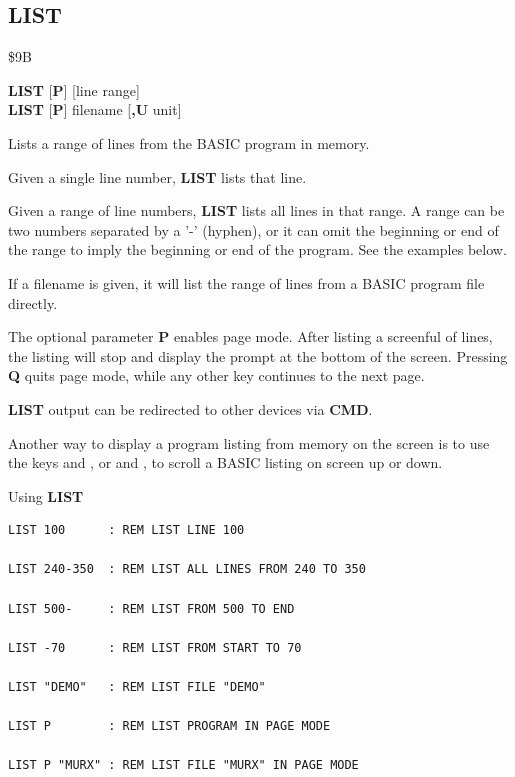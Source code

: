 
\label{BASIC 65 Commands!LIST}
\newpage
\subsection{LIST}
\begin{description}[leftmargin=2cm,style=nextline]
\item [Token:]    \$9B

\item [Format:]   {\bf LIST} [{\bf P}] [line range] \\
                  {\bf LIST} [{\bf P}] filename [{\bf,U} unit]

\item [Usage:]    Lists a range of lines from the BASIC program in memory.

                  Given a single line number, {\bf LIST} lists that line.

                  Given a range of line numbers, {\bf LIST} lists all lines in that range. A range can be two numbers separated by a '-' (hyphen), or it can omit the beginning or end of the range to imply the beginning or end of the program. See the examples below.

                  If a filename is given, it will list the range of lines from a BASIC program file directly.

\item [Remarks:]  The optional parameter {\bf P} enables page mode. After listing a screenful of lines, the listing will stop and display the prompt \screentext{[MORE]} at the bottom of the screen. Pressing {\bf Q} quits page mode, while any other key continues to the next page.

                  {\bf LIST} output can be redirected to other devices via {\bf CMD}.

                  Another way to display a program listing from memory on the screen is to use the keys  and , or   and  , to scroll a BASIC listing on screen up or down.

\item [Examples:] Using {\bf LIST}

\begin{tcolorbox}[colback=black,coltext=white]
\verbatimfont{\codefont}
\begin{verbatim}
LIST 100      : REM LIST LINE 100

LIST 240-350  : REM LIST ALL LINES FROM 240 TO 350

LIST 500-     : REM LIST FROM 500 TO END

LIST -70      : REM LIST FROM START TO 70

LIST "DEMO"   : REM LIST FILE "DEMO"

LIST P        : REM LIST PROGRAM IN PAGE MODE

LIST P "MURX" : REM LIST FILE "MURX" IN PAGE MODE
\end{verbatim}
\end{tcolorbox}
\end{description}

